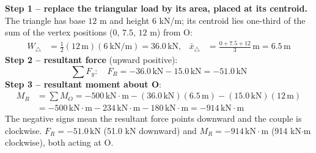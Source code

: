 \documentclass[11pt]{article}
\newcommand{\kN}{\,\mathrm{kN}}
\newcommand{\m}{\,\mathrm{m}}
\newcommand{\kNm}{\,\mathrm{kN{\cdot}m}}
\begin{document}
{
}{
\textbf{Step 1 -- replace the triangular load by its area, placed at its centroid.} The triangle has base $12$ m and height $6$ kN/m; its centroid lies one-third of the sum of the vertex positions ($0$, $7.5$, $12$ m) from O:
\begin{align*}
W_\triangle &= \tfrac12(12\m)(6\ \mathrm{kN/m}) = 36.0\kN, &
\bar{x}_\triangle &= \frac{0+7.5+12}{3}\m = 6.5\m
\end{align*}
\textbf{Step 2 -- resultant force} (upward positive):
\[
\sum F_y:\quad F_R = -36.0\kN - 15.0\kN = -51.0\kN 
\]
\textbf{Step 3 -- resultant moment about O}:
\begin{align*}
M_R &= \sum M_O = -500\kNm - (36.0\kN)(6.5\m) - (15.0\kN)(12\m)\\
    &= -500\kNm - 234\kNm - 180\kNm = -914\kNm
\end{align*}
The negative signs mean the resultant force points downward and the couple is clockwise.
}{
$F_R = -51.0\kN$ (51.0 kN downward) and $M_R = -914\kNm$ (914 kN$\cdot$m clockwise), both acting at O.
}
\end{document}

